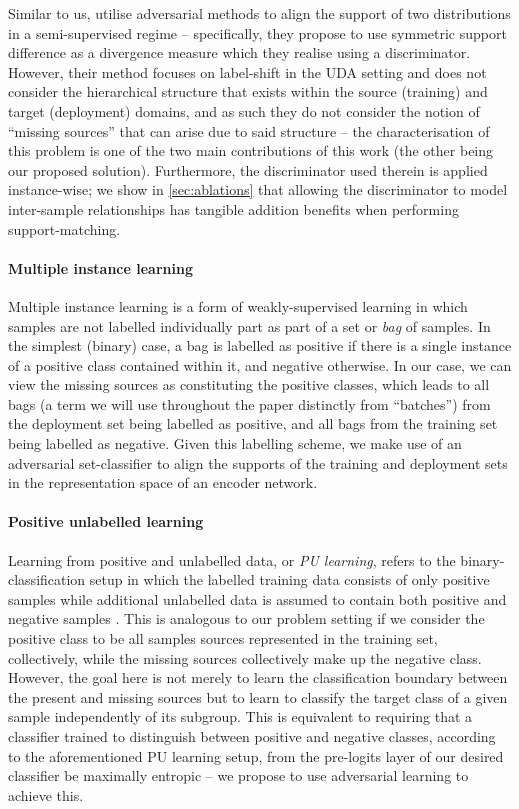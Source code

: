 Similar to us, \citet{tong2022adversarial} utilise adversarial methods to align the support of two
distributions in a semi-supervised regime -- specifically, they propose to use symmetric support
difference as a divergence measure which they realise using a discriminator. 
However, their method focuses on label-shift in the UDA
setting and does not consider the hierarchical structure that exists within the source (training)
and target (deployment) domains, and as such they do not consider the notion of ``missing sources''
that can arise due to said structure -- the characterisation of this problem is one of the two
main contributions of this work (the other being our proposed solution). Furthermore, the
discriminator used therein is applied instance-wise; we show in \ref{sec:ablations} that allowing
the discriminator to model inter-sample relationships has tangible addition benefits when
performing support-matching.

\paragraph{Multiple instance learning}
Multiple instance learning \citep{maron1998framework} is a form of weakly-supervised learning in
which samples are not labelled individually part as part of a set or \emph{bag} of samples.
%
In the simplest (binary) case, a bag is labelled as positive if there is a single instance of a
positive class contained within it, and negative otherwise.
%
In our case, we can view the missing sources as constituting the positive classes, which leads to
all bags (a term we will use throughout the paper distinctly from ``batches'') from the deployment
set being labelled as positive, and all bags from the training set being labelled as negative.
%
Given this labelling scheme, we make use of an adversarial set-classifier to align the supports of
the training and deployment sets in the representation space of an encoder network.
%

\paragraph{Positive unlabelled learning}
Learning from positive and unlabelled data, or \emph{PU learning}, refers to the
binary-classification setup in which the labelled training data consists of only positive samples
while additional unlabelled data is assumed to contain both positive and negative samples
\citep{liu2002partially, liu2003building, bekker2020learning}. This is analogous to our problem
setting if we consider the positive class to be all samples sources represented in the training
set, collectively, while the missing sources collectively make up the negative class. However, the
goal here is not merely to learn the classification boundary between the present and missing
sources but to learn to classify the target class of a given sample independently of its subgroup.
This is equivalent to requiring that a classifier trained to distinguish between positive and
negative classes, according to the aforementioned PU learning setup, from the pre-logits layer of
our desired classifier be maximally entropic -- we propose to use adversarial learning to achieve
this.

